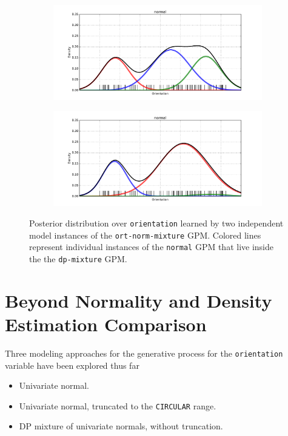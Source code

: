\documentclass[10pt,letterpaper]{article}
\numberwithin{figure}{section}
\numberwithin{table}{section}
\begin{document}
\begin{figure}[H]
\centering
\begin{subfigure}[t]{.45\textwidth}
  \centering
  \includegraphics[width=\linewidth]{../figures/normal-mixture-density}
\end{subfigure}
\begin{subfigure}[t]{0.45\textwidth}
  \centering
  \includegraphics[width=\linewidth]{../figures/normal-mixture-density-2}
\end{subfigure}
\caption{Posterior distribution over \texttt{orientation} learned by two
independent model instances of the \texttt{ort-norm-mixture} GPM. Colored lines
represent individual instances of the \texttt{normal} GPM that live inside the
the \texttt{dp-mixture} GPM.}
\label{fig:normal-mixture-densities}
\end{figure}

\section{Beyond Normality and Density Estimation Comparison}

Three modeling approaches for the generative process for the \texttt{orientation}
variable have been explored thus far

\begin{itemize}
\item Univariate normal.
\item Univariate normal, truncated to the \texttt{CIRCULAR} range.
\item DP mixture of univariate normals, without truncation.
\end{itemize}
\end{document}
